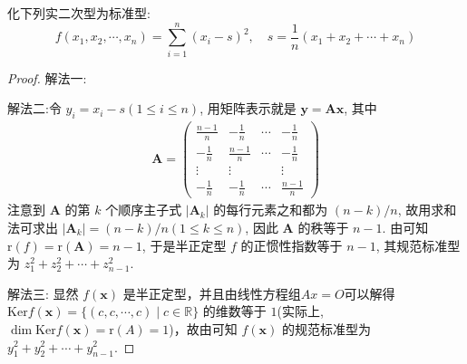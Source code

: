 \documentclass[../../main.tex]{subfiles}%
\begin{document}
\begin{example}\label{example:例8.34}
化下列实二次型为标准型:
\[f(x_1,x_2,\cdots,x_n)=\sum_{i = 1}^{n}(x_i - s)^2, \quad s = \frac{1}{n}(x_1 + x_2 + \cdots + x_n)\]
\end{example}
\begin{proof}

{\color{blue}解法一:}

{\color{blue}解法二:}令 \(y_i = x_i - s(1\leqslant  i\leqslant  n)\), 用矩阵表示就是 \(\boldsymbol{y} = \boldsymbol{A}\boldsymbol{x}\), 其中
\begin{align*}
\boldsymbol{A} = \begin{pmatrix}
\frac{n - 1}{n} & -\frac{1}{n} & \cdots & -\frac{1}{n} \\
-\frac{1}{n} & \frac{n - 1}{n} & \cdots & -\frac{1}{n} \\
\vdots & \vdots & & \vdots \\
-\frac{1}{n} & -\frac{1}{n} & \cdots & \frac{n - 1}{n}
\end{pmatrix}
\end{align*}
注意到 \(\boldsymbol{A}\) 的第 \(k\) 个顺序主子式 \(|\boldsymbol{A}_k|\) 的每行元素之和都为 \((n - k)/n\), 故用求和法可求出 \(|\boldsymbol{A}_k| = (n - k)/n(1\leqslant  k\leqslant  n)\), 因此 \(\boldsymbol{A}\) 的秩等于 \(n - 1\). 由可知 \(\mathrm{r}(f)=\mathrm{r}(\boldsymbol{A}) = n - 1\), 于是半正定型 \(f\) 的正惯性指数等于 \(n - 1\), 其规范标准型为 \(z_1^2 + z_2^2 + \cdots + z_{n - 1}^2\).

{\color{blue}解法三:}
显然 $f(\boldsymbol{x})$ 是半正定型，并且由线性方程组$Ax=O$可以解得 $\mathrm{Ker} f(\boldsymbol{x})=\{(c,c,\cdots,c)\mid c\in\mathbb{R}\}$ 的维数等于 $1$(实际上,$\dim \mathrm{Ker} f(\boldsymbol{x})=\mathrm{r}(A)=1$)，故由可知 $f(\boldsymbol{x})$ 的规范标准型为 $y_1^2 + y_2^2+\cdots + y_{n - 1}^2$.  
\end{proof}
\end{document}
